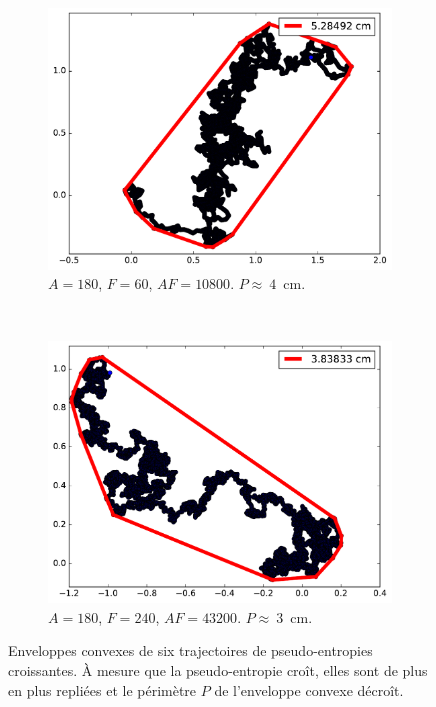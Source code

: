 \begin{figure}[htb]
\begin{subfigure}[t]{\subImgWmo}
			\includegraphics[width=\textwidth]{figures/ch3/areaTraj_2_19_180_60}
			\caption{$A = 180$, $F=60$, $AF=10800$. $P\approx~4$~cm.}
			\label{fig:areaTraj_2_19_180_60}
		\end{subfigure}
		~
		\begin{subfigure}[t]{\subImgWmo}
			\centering
			\includegraphics[width=\textwidth]{figures/ch3/areaTraj_2_19_180_240}
			\caption{$A = 180$, $F=240$, $AF=43200$. $P\approx~3$~cm.}
			\label{fig:areaTraj_2_19_180_240}
		\end{subfigure}
		\caption[Enveloppes convexes]{Enveloppes convexes de six trajectoires de pseudo-entropies croissantes. À mesure que la pseudo-entropie croît, elles sont de plus en plus \og repliées \fg{} et le périmètre $P$ de l'enveloppe convexe décroît.}
		\label{fig:trajAreas}
	\end{figure}
	
